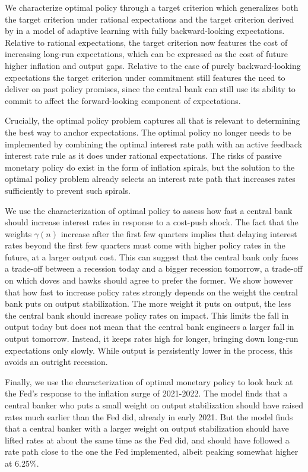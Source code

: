 \documentclass{article}
\begin{document}
We characterize optimal policy through a target criterion which generalizes both the target criterion under rational expectations and the target criterion derived by \cite{MolnarSantoro2014} in a model of adaptive learning with fully backward-looking expectations. Relative to rational expectations, the target criterion now features the cost of increasing long-run expectations, which can be expressed as the cost of future higher inflation and output gaps. Relative to the case of purely backward-looking expectations the target criterion under commitment still features the need to deliver on past policy promises, since the central bank can still use its ability to commit to affect the forward-looking component of expectations. 

Crucially, the optimal policy problem captures all that is relevant to determining the best way to anchor expectations. The optimal policy no longer needs to be implemented by combining the optimal interest rate path with an active feedback interest rate rule as it does under rational expectations. The risks of passive monetary policy do exist in the form of inflation spirals, but the solution to the optimal policy problem already selects an interest rate path that increases rates sufficiently to prevent such spirals.

We use the characterization of optimal policy to assess how fast a central bank should increase interest rates in response to a cost-push shock. The fact that the weights $\gamma(n)$ increase after the first few quarters implies that delaying interest rates beyond the first few quarters must come with higher policy rates in the future, at a larger output cost. This can suggest that the central bank only faces a trade-off between a recession today and a bigger recession tomorrow, a trade-off on which doves and hawks should agree to prefer the former. We show however that how fast to increase policy rates strongly depends on the weight the central bank puts on output stabilization. The more weight it puts on output, the less the central bank should increase policy rates on impact. This limits the fall in output today but does not mean that the central bank engineers a larger fall in output tomorrow. Instead, it keeps rates high for longer, bringing down long-run expectations only slowly. While output is persistently lower in the process, this avoids an outright recession.

Finally, we use the characterization of optimal monetary policy to look back at the Fed's response to the inflation surge of 2021-2022. The model finds that a central banker who puts a small weight on output stabilization should have raised rates much earlier than the Fed did, already in early 2021. But the model finds that a central banker with a larger weight on output stabilization should have lifted rates at about the same time as the Fed did, and should have followed a rate path close to the one the Fed implemented, albeit peaking somewhat higher at 6.25\%.
\end{document}
